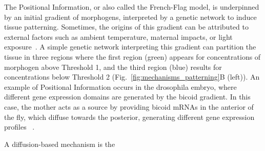 The Positional Information, or also called the French-Flag model, is underpinned by an initial gradient of morphogens, interpreted by a genetic network to induce tissue patterning.
Sometimes, the origins of this gradient can be attributed to external factors such as ambient temperature, maternal impacts, or light exposure~\parencite{Schier2009}.
A simple genetic network interpreting this gradient can partition the tissue in three regions where the first region (green) appears for concentrations of morphogen above Threshold 1, and the third region (blue) results for concentrations below Threshold 2 (Fig.~\ref{fig:mechanisms_patterning}B (left)).
An example of Positional Information occurs in the drosophila embryo, where different gene expression domains are generated by the bicoid gradient.
In this case, the mother acts as a source by providing bicoid mRNAs in the anterior of the fly, which diffuse towards the posterior, generating different gene expression profiles ~\parencite{grimm2010modelling}.

A diffusion-based mechanism is the




